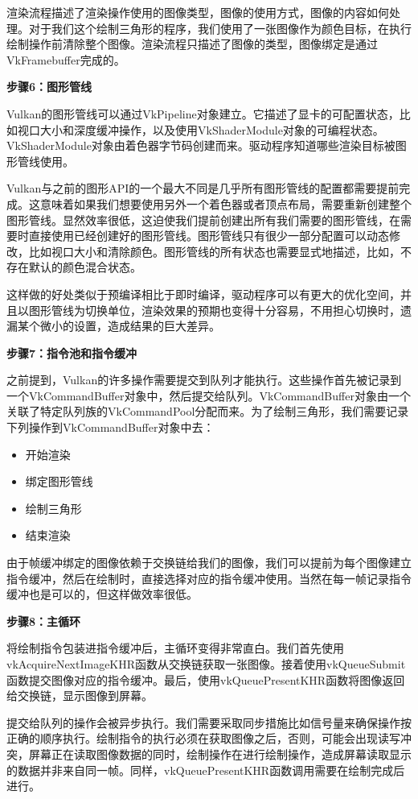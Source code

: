 \documentclass{ctexart}
\begin{document}
渲染流程描述了渲染操作使用的图像类型，图像的使用方式，图像的内容如何处理。对于我们这个绘制三角形的程序，我们使用了一张图像作为颜色目标，在执行绘制操作前清除整个图像。渲染流程只描述了图像的类型，图像绑定是通过VkFramebuffer完成的。

\textbf{步骤6：图形管线}

Vulkan的图形管线可以通过VkPipeline对象建立。它描述了显卡的可配置状态，比如视口大小和深度缓冲操作，以及使用VkShaderModule对象的可编程状态。VkShaderModule对象由着色器字节码创建而来。驱动程序知道哪些渲染目标被图形管线使用。

Vulkan与之前的图形API的一个最大不同是几乎所有图形管线的配置都需要提前完成。这意味着如果我们想要使用另外一个着色器或者顶点布局，需要重新创建整个图形管线。显然效率很低，这迫使我们提前创建出所有我们需要的图形管线，在需要时直接使用已经创建好的图形管线。图形管线只有很少一部分配置可以动态修改，比如视口大小和清除颜色。图形管线的所有状态也需要显式地描述，比如，不存在默认的颜色混合状态。

这样做的好处类似于预编译相比于即时编译，驱动程序可以有更大的优化空间，并且以图形管线为切换单位，渲染效果的预期也变得十分容易，不用担心切换时，遗漏某个微小的设置，造成结果的巨大差异。

\textbf{步骤7：指令池和指令缓冲}

之前提到，Vulkan的许多操作需要提交到队列才能执行。这些操作首先被记录到一个VkCommandBuffer对象中，然后提交给队列。VkCommandBuffer对象由一个关联了特定队列族的VkCommandPool分配而来。为了绘制三角形，我们需要记录下列操作到VkCommandBuffer对象中去：

\begin{itemize}
	\item 开始渲染
	\item 绑定图形管线
	\item 绘制三角形
	\item 结束渲染
\end{itemize}

由于帧缓冲绑定的图像依赖于交换链给我们的图像，我们可以提前为每个图像建立指令缓冲，然后在绘制时，直接选择对应的指令缓冲使用。当然在每一帧记录指令缓冲也是可以的，但这样做效率很低。

\textbf{步骤8：主循环}

将绘制指令包装进指令缓冲后，主循环变得非常直白。我们首先使用vkAcquireNextImageKHR函数从交换链获取一张图像。接着使用vkQueueSubmit函数提交图像对应的指令缓冲。最后，使用vkQueuePresentKHR函数将图像返回给交换链，显示图像到屏幕。

提交给队列的操作会被异步执行。我们需要采取同步措施比如信号量来确保操作按正确的顺序执行。绘制指令的执行必须在获取图像之后，否则，可能会出现读写冲突，屏幕正在读取图像数据的同时，绘制操作在进行绘制操作，造成屏幕读取显示的数据并非来自同一帧。同样，vkQueuePresentKHR函数调用需要在绘制完成后进行。
\end{document}
